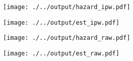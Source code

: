 \documentclass{div}
\begin{document}
\begin{figure}[t]\caption{IPW}
\vspace{-0.5em}
\centering
\begin{subfigure}{.525\textwidth}
\centering
\texttt{[image: ./../output/hazard\_ipw.pdf]}
\end{subfigure}
\begin{subfigure}{.45\textwidth}
\centering
\texttt{[image: ./../output/est\_ipw.pdf]}
\end{subfigure}
\vspace{-0.75em}
\end{figure}

\begin{figure}[t]\caption{Raw}
\vspace{-0.5em}
\centering
\begin{subfigure}{.525\textwidth}
\centering
\texttt{[image: ./../output/hazard\_raw.pdf]}
\end{subfigure}
\begin{subfigure}{.45\textwidth}
\centering
\texttt{[image: ./../output/est\_raw.pdf]}
\end{subfigure}
\vspace{-0.75em}
\end{figure}
\end{document}
